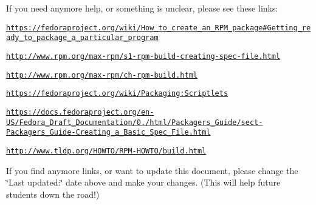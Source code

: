 If you need anymore help, or something is unclear, please see these links\-:

\href{https://fedoraproject.org/wiki/How_to_create_an_RPM_package#Getting_ready_to_package_a_particular_program}{\tt https\-://fedoraproject.\-org/wiki/\-How\-\_\-to\-\_\-create\-\_\-an\-\_\-\-R\-P\-M\-\_\-package\#\-Getting\-\_\-ready\-\_\-to\-\_\-package\-\_\-a\-\_\-particular\-\_\-program}

\href{http://www.rpm.org/max-rpm/s1-rpm-build-creating-spec-file.html}{\tt http\-://www.\-rpm.\-org/max-\/rpm/s1-\/rpm-\/build-\/creating-\/spec-\/file.\-html}

\href{http://www.rpm.org/max-rpm/ch-rpm-build.html}{\tt http\-://www.\-rpm.\-org/max-\/rpm/ch-\/rpm-\/build.\-html}

\href{https://fedoraproject.org/wiki/Packaging:Scriptlets}{\tt https\-://fedoraproject.\-org/wiki/\-Packaging\-:\-Scriptlets}

\href{https://docs.fedoraproject.org/en-US/Fedora_Draft_Documentation/0.1/html/Packagers_Guide/sect-Packagers_Guide-Creating_a_Basic_Spec_File.html}{\tt https\-://docs.\-fedoraproject.\-org/en-\/\-U\-S/\-Fedora\-\_\-\-Draft\-\_\-\-Documentation/0./html/\-Packagers\-\_\-\-Guide/sect-\/\-Packagers\-\_\-\-Guide-\/\-Creating\-\_\-a\-\_\-\-Basic\-\_\-\-Spec\-\_\-\-File.\-html}

\href{http://www.tldp.org/HOWTO/RPM-HOWTO/build.html}{\tt http\-://www.\-tldp.\-org/\-H\-O\-W\-T\-O/\-R\-P\-M-\/\-H\-O\-W\-T\-O/build.\-html}

If you find anymore links, or want to update this document, please change the \char`\"{}\-Last updated\-:\char`\"{} date above and make your changes. (This will help future students down the road!) 